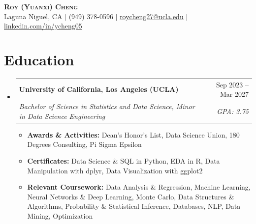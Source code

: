 \documentclass[letterpaper,11pt]{article}
\makeatletter
\newcommand{\resumeItem}[1]{
  \item\small{#1}
}
\newcommand{\resumeSubheading}[4]{
  \vspace{-2pt}\item
    \begin{tabular*}{\textwidth}[t]{l@{\extracolsep{\fill}}r}
      \textbf{#1} & #2 \\
      \textit{\small#3} & \textit{\small #4} \\
    \end{tabular*}\vspace{-7pt}
}
\newcommand{\resumeSubHeadingListStart}{\begin{itemize}[leftmargin=0in, label={}]}
\newcommand{\resumeSubHeadingListEnd}{\end{itemize}}
\newcommand{\resumeItemListStart}{\begin{itemize}[itemsep= 1.5pt, parsep=0pt]}
\newcommand{\resumeItemListEnd}{\end{itemize}\vspace{-5pt}}
\makeatother
\begin{document}
\begin{center}
    \textbf{\LARGE \scshape Roy (Yuanxi) Cheng} \\ \vspace{3pt}
    \small Laguna Niguel, CA $|$ (949) 378-0596 $|$
    \href{mailto:roycheng27@ucla.edu}{\underline{roycheng27@ucla.edu}} $|$
    \href{https://www.linkedin.com/in/ycheng05}{\underline{linkedin.com/in/ycheng05}}
\end{center}
\section{Education}
  \resumeSubHeadingListStart
    \resumeSubheading
      {University of California, Los Angeles (UCLA)}{Sep 2023 -- Mar 2027}
      {Bachelor of Science in Statistics and Data Science, Minor in Data Science Engineering}{GPA: 3.75}
      \resumeItemListStart
        \resumeItem{\textbf{Awards \& Activities:} Dean's Honor's List, Data Science Union, 180 Degrees Consulting, Pi Sigma Epsilon}
        \resumeItem{\textbf{Certificates:} Data Science \& SQL in Python, EDA in R, Data Manipulation with dplyr, Data Visualization with ggplot2}
        \resumeItem{\textbf{Relevant Coursework:} Data Analysis \& Regression, Machine Learning, Neural Networks \& Deep Learning, Monte Carlo, Data Structures \& Algorithms, Probability \& Statistical Inference, Databases, NLP, Data Mining, Optimization}
      \resumeItemListEnd
  \resumeSubHeadingListEnd
\end{document}

